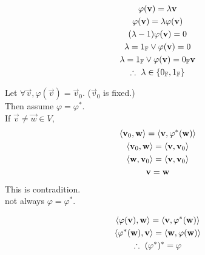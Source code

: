 \documentclass[1]{mathtoolkit}
\begin{document}
\begin{p}
  \item
    \begin{subp}
      \item
        \begin{gather}
          \varphi(\vec{v}) = \lambda \vec{v} \\
          \varphi(\vec{v}) = \lambda \varphi(\vec{v}) \\
          (\lambda - 1) \varphi(\vec{v}) = 0 \\
          \lambda = 1_\field{F} \vee \varphi(\vec{v}) = 0 \\
          \lambda = 1_\field{F} \vee \varphi(\vec{v}) = 0_\field{F} \vec{v} \\
          \therefore \lambda \in \left\{ 0_\field{F}, 1_\field{F} \right\}
        \end{gather}

      \item
        Let $\forall \vec{v}, \varphi(\vec{v}) = \vec{v}_0$.
        ($\vec{v}_0$ is fixed.) \\
        Then assume $\varphi = \varphi^*$. \\
        If $\vec{v} \ne \vec{w} \in V$,
        \begin{gather}
          \langle \mathbf{v}_0, \mathbf{w} \rangle = \langle \mathbf{v}, \varphi^*(\mathbf{w}) \rangle \\
          \langle \mathbf{v}_0, \mathbf{w} \rangle = \langle \mathbf{v}, \mathbf{v}_0 \rangle \\
          \langle \mathbf{w}, \mathbf{v}_0 \rangle = \langle \mathbf{v}, \mathbf{v}_0 \rangle \\
          \mathbf{v} = \mathbf{w}
        \end{gather}
        This is contradition. \\
        \therefore not always $\varphi = \varphi^*$.
    \end{subp}

  \item
    \begin{subp}
      \item
        \begin{gather}
          \ip{\varphi(\vec{v})}{\vec{w}} = \ip{\vec{v}}{\varphi^*(\vec{w})} \\
          \ip{\varphi^*(\vec{w})}{\vec{v}} = \ip{\vec{w}}{\varphi(\vec{w})} \\
          \therefore (\varphi^*)^* = \varphi
        \end{gather}
    \end{subp}
\end{p}
\end{document}
